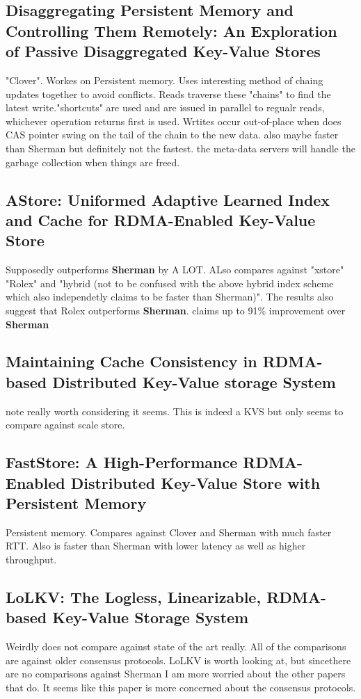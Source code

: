 \documentclass[sigplan,nonacm]{acmart}
\begin{document}
    \subsection{Disaggregating Persistent Memory and Controlling Them Remotely: An Exploration of Passive Disaggregated Key-Value Stores}
    "Clover". Workes on Persistent memory. Uses interesting method of chaing updates together to avoid conflicts. Reads traverse
    these "chains" to find the latest write."shortcuts" are used and are issued in parallel to regualr reads, whichever 
    operation returns first is used. Wrtites occur out-of-place when does CAS pointer swing on the tail of the chain to the new data. also maybe faster 
    than Sherman but definitely not the fastest. the meta-data servers will handle the garbage collection when things are freed.\cite{Tsai-USENIX-2020}

    \subsection{AStore: Uniformed Adaptive Learned Index and Cache for RDMA-Enabled Key-Value Store}
    Supposedly outperforms \textbf{Sherman} by A LOT. ALso compares against "xstore" "Rolex" and "hybrid (not to be confused
    with the above hybrid index scheme which also independetly claims to be faster than Sherman)". 
    The results also suggest that Rolex outperforms \textbf{Sherman}. claims up to 91\% improvement over \textbf{Sherman}\cite{Qiao-IEEEtrans-2024}

    \subsection{Maintaining Cache Consistency in RDMA-based Distributed Key-Value storage System}
    note really worth considering it seems. This is indeed a KVS but only seems to compare against scale store. \cite{Hou-DSIT-2024}

    \subsection{FastStore: A High-Performance RDMA-Enabled Distributed Key-Value Store with Persistent Memory}
    Persistent memory. Compares against Clover and Sherman with much faster RTT. Also is faster than Sherman with lower latency 
    as well as higher throughput. \cite{Xiong-ICDCS-2023}

    \subsection{LoLKV: The Logless, Linearizable, RDMA-based Key-Value Storage System}
    Weirdly does not compare against state of the art really. All of the comparisons are against older consensus protocols.
    LoLKV is worth looking at, but sincethere are no comparisons against Sherman I am more worried about the other papers 
    that do. It seems like this paper is more concerned about the consensus protocols. \cite{Alquraan-NSDI-2024}
\end{document}

